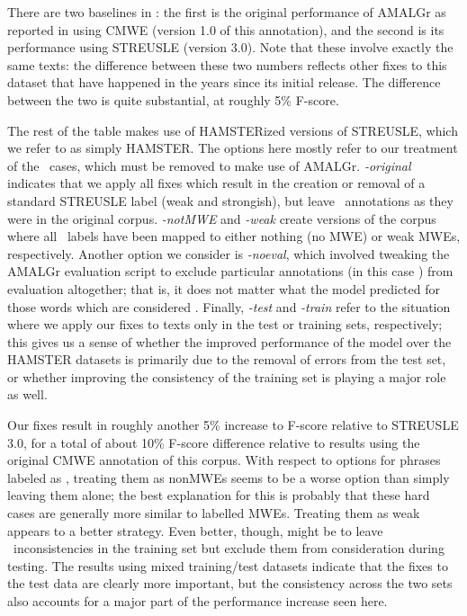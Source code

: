 \documentclass[output=paper,modfonts,nonflat]{langsci/langscibook}
\begin{document}
There are two baselines in : the first is the original performance of AMALGr as reported in \citet{Schneider14b} using CMWE (version 1.0 of this annotation), and the second is its performance using STREUSLE (version 3.0). Note that these involve exactly the same texts: the difference between these two numbers reflects other fixes to this dataset that have happened in the years since its initial release. The difference between the two is quite substantial, at roughly 5\% F-score.

The rest of the table makes use of HAMSTERized versions of STREUSLE, which we refer to as simply HAMSTER. The options here mostly refer to our treatment of the \hard~cases, which must be removed to make use of AMALGr. \emph{-original} indicates that we apply all fixes which result in the creation or removal of a standard STREUSLE label (\ie weak and strongish), but leave \hard~annotations as they were in the original corpus. \emph{-notMWE} and \emph{-weak} create versions of the corpus where all \hard~labels have been mapped to either nothing (no MWE) or weak MWEs, respectively. Another option we consider is \emph{-noeval}, which involved tweaking the AMALGr evaluation script to exclude particular annotations (in this case \hard) from evaluation altogether; that is, it does not matter what the model predicted for those words which are considered \hard. Finally, {\nobreakdash\emph{-test} and \emph{-train}} refer to the situation where we apply our fixes to texts only in the test or training sets, respectively; this gives us a sense of whether the improved performance of the model over the HAMSTER datasets is primarily due to the removal of errors from the test set, or whether improving the consistency of the training set is playing a major role as well.

Our fixes result in roughly another 5\% increase to F-score relative to STREUSLE 3.0, for a total of about 10\% F-score difference relative to results using the original CMWE annotation of this corpus. With respect to options for phrases labeled as \hard, treating them as nonMWEs seems to be a worse option than simply leaving them alone; the best explanation for this is probably that these hard cases are generally more similar to labelled MWEs. Treating them as weak appears to a better strategy. Even better, though, might be to leave \hard~inconsistencies in the training set but exclude them from consideration during testing. The results using mixed training/test datasets indicate that the fixes to the test data are clearly more important, but the consistency across the two sets also accounts for a major part of the performance increase seen here.
\end{document}
